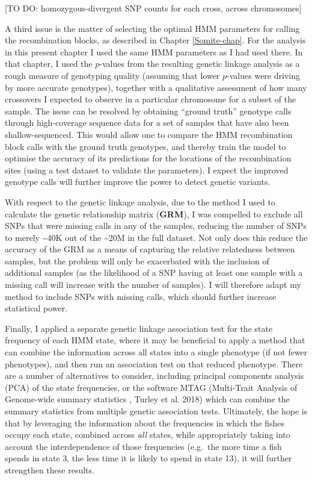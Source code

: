 \documentclass[
]{book}
\begin{document}
{[}TO DO: homozygous-divergent SNP counts for each cross, across chromosomes{]}

A third issue is the matter of selecting the optimal HMM parameters for calling the recombination blocks, as described in Chapter \ref{Somite-chap}. For the analysis in this present chapter I used the same HMM parameters as I had used there. In that chapter, I used the \(p\)-values from the resulting genetic linkage analysis as a rough measure of genotyping quality (assuming that lower \(p\)-values were driving by more accurate genotypes), together with a qualitative assessment of how many crossovers I expected to observe in a particular chromosome for a subset of the sample. The issue can be resolved by obtaining ``ground truth'' genotype calls through high-coverage sequence data for a set of samples that have also been shallow-sequenced. This would allow one to compare the HMM recombination block calls with the ground truth genotypes, and thereby train the model to optimise the accuracy of its predictions for the locations of the recombination sites (using a test dataset to validate the parameters). I expect the improved genotype calls will further improve the power to detect genetic variants.

With respect to the genetic linkage analysis, due to the method I used to calculate the genetic relationship matrix (\textbf{GRM}), I was compelled to exclude all SNPs that were missing calls in any of the samples, reducing the number of SNPs to merely \textasciitilde40K out of the \textasciitilde20M in the full dataset. Not only does this reduce the accuracy of the GRM as a means of capturing the relative relatedness between samples, but the problem will only be exacerbated with the inclusion of additional samples (as the likelihood of a SNP having at least one sample with a missing call will increase with the number of samples). I will therefore adapt my method to include SNPs with missing calls, which should further increase statistical power.

Finally, I applied a separate genetic linkage association test for the state frequency of each HMM state, where it may be beneficial to apply a method that can combine the information across all states into a single phenotype (if not fewer phenotypes), and then run an association test on that reduced phenotype. There are a number of alternatives to consider, including principal components analysis (PCA) of the state frequencies, or the software MTAG (Multi-Trait Analysis of Genome-wide summary statistics , Turley et al. 2018) which can combine the summary statistics from multiple genetic association tests. Ultimately, the hope is that by leveraging the information about the frequencies in which the fishes occupy each state, combined across \emph{all} states, while appropriately taking into account the interdependence of those frequencies (e.g.~the more time a fish spends in state 3, the less time it is likely to spend in state 13), it will further strengthen these results.
\end{document}
